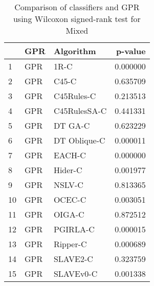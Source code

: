 \begin{table}
\footnotesize
\caption{Comparison of classifiers and GPR using Wilcoxon signed-rank test for Mixed}
\label{tab:GPR wilcoxon Mixed comparison}
\begin{tabular}{lllr}
\hline
 & GPR & Algorithm & p-value \\
\hline
1 & GPR & 1R-C & 0.000000 \\
2 & GPR & C45-C & 0.635709 \\
3 & GPR & C45Rules-C & 0.213513 \\
4 & GPR & C45RulesSA-C & 0.441331 \\
5 & GPR & DT GA-C & 0.623229 \\
6 & GPR & DT Oblique-C & 0.000011 \\
7 & GPR & EACH-C & 0.000000 \\
8 & GPR & Hider-C & 0.001977 \\
9 & GPR & NSLV-C & 0.813365 \\
10 & GPR & OCEC-C & 0.003051 \\
11 & GPR & OIGA-C & 0.872512 \\
12 & GPR & PGIRLA-C & 0.000015 \\
13 & GPR & Ripper-C & 0.000689 \\
14 & GPR & SLAVE2-C & 0.323759 \\
15 & GPR & SLAVEv0-C & 0.001338 \\
\hline
\end{tabular}
\end{table}
